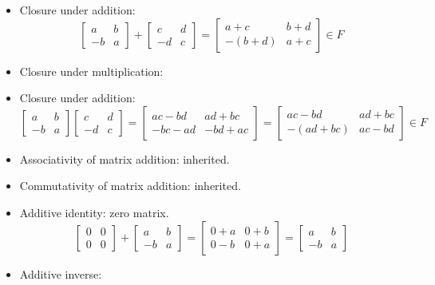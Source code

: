 \documentclass{amsart}
\begin{document}
	\begin{itemize}
		\item Closure under addition:
		$$ \begin{bmatrix}
		a & b \\
		-b & a
		\end{bmatrix} + \begin{bmatrix}
		c & d \\
		-d & c
		\end{bmatrix} = \begin{bmatrix}
		a+c & b+d \\
		-(b+d) & a+c
		\end{bmatrix} \in F $$
		\item Closure under multiplication:
		\item Closure under addition:
		$$ \begin{bmatrix}
		a & b \\
		-b & a
		\end{bmatrix} \begin{bmatrix}
		c & d \\
		-d & c
		\end{bmatrix} = \begin{bmatrix}
		ac-bd & ad+bc \\
		-bc-ad & -bd+ac
		\end{bmatrix} = \begin{bmatrix}
		ac-bd & ad+bc \\
		-(ad+bc) & ac-bd
		\end{bmatrix} \in F $$
		\item Associativity of matrix addition: inherited.
		\item Commutativity of matrix addition: inherited.
		\item Additive identity: zero matrix.
		$$ \begin{bmatrix}
		0 & 0 \\
		0 & 0
		\end{bmatrix} +
		\begin{bmatrix}
		a & b \\
		-b & a
		\end{bmatrix} = \begin{bmatrix}
		0+a & 0+b \\
		0-b & 0+a
		\end{bmatrix} = \begin{bmatrix}
		a & b \\
		-b & a
		\end{bmatrix}$$
		\item Additive inverse:

\end{itemize}
\end{document}

